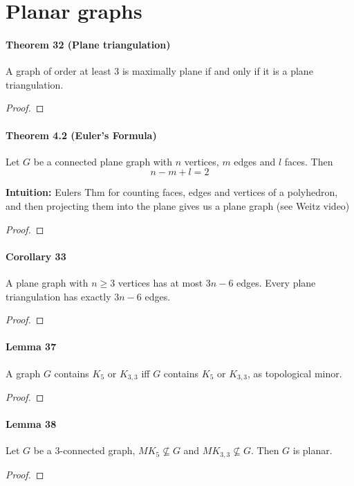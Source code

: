 \section{Planar graphs}

\paragraph{Theorem 32 (Plane triangulation)} A graph of order at least 3 is 
maximally plane if and only if it is a plane triangulation.
\begin{proof}
    
\end{proof}

\paragraph{Theorem 4.2 (Euler's Formula)} Let $ G $ be a connected plane graph 
with $ n $ vertices, $ m $ edges and $ l $ faces. Then 
$$ n - m + l = 2 $$

\smallskip \noindent
\textbf{Intuition:} Eulers Thm for counting faces, edges and vertices of a 
polyhedron, and then projecting them into the plane gives us a plane graph 
(see Weitz video)
\begin{proof}
    
\end{proof}

\paragraph{Corollary 33} A plane graph with $ n \geq 3 $ vertices has at most 
$ 3n - 6 $ edges. Every plane triangulation has exactly $ 3n - 6 $ edges.
\begin{proof}

\end{proof}

\paragraph{Lemma 37} A graph $ G $ contains $ K_5 $ or $ K_{3,3} $ iff 
$ G $ contains $ K_5 $ or $ K_{3,3} $, as topological minor.
\begin{proof}
    
\end{proof}

\paragraph{Lemma 38} Let $ G $ be a 3-connected graph, $ MK_5 \nsubseteq G $ and 
$ MK_{3,3} \nsubseteq G $. Then $ G $ is planar.
\begin{proof}
    
\end{proof}


